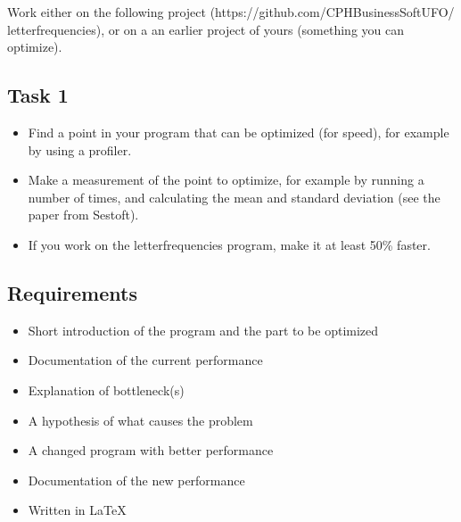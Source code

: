 
Work either on the following project (https://github.com/CPHBusinessSoftUFO/
letterfrequencies), or on a an earlier project of yours (something you can
optimize).
\vspace{0.5cm}
\subsection{Task 1}
\label{sec:1.1}
\begin{itemize}
    \item Find a point in your program that can be optimized (for speed), for example by using a profiler.
    \item Make a measurement of the point to optimize, for example by running a
    number of times, and calculating the mean and standard deviation (see
    the paper from Sestoft).
    \item If you work on the letterfrequencies program, make it at least 50\%
    faster.
\end{itemize}
\vspace{0.5cm}
\subsection{Requirements}
\label{sec:1.2}
\begin{itemize}
    \item Short introduction of the program and the part to be optimized
    \item Documentation of the current performance
    \item Explanation of bottleneck(s)
    \item A hypothesis of what causes the problem
    \item A changed program with better performance
    \item Documentation of the new performance
    \item Written in \LaTeX\ 
\end{itemize}







